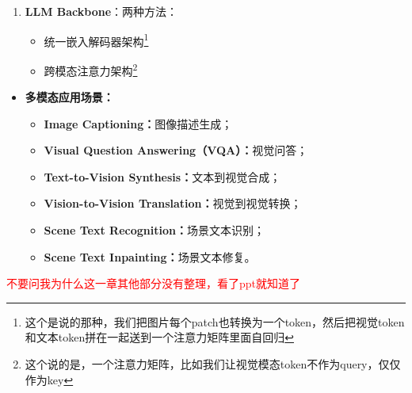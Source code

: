 \documentclass[../main.tex]{subfiles}
\begin{document}
\begin{enumerate}
\begin{enumerate}
\begin{itemize}
            \item 使用线性投影仪或多层感知器(\textbf{MLP})，通常为几层的神经网与非线性激活函数组合而成。
            \item 基于注意力机制。BLIP2引入\textbf{Q-Former}，一种轻量级转换器，使用一组可学习的查询向量从冻结的视觉模型中提取视觉特征。
            \item 投影基于\textbf{CNN}。MobileVLMv2提出了LDPv2，这是一种新的投影。由三部分组成:特征转换、Token压缩和位置信息增强。
            \item 投影基于\textbf{mamba}\footnote{MAN！}。VL-Mamba在其视觉语言投影仪中实现了2D视觉选择性扫描(VSS)技术，促进了不同学习方法的融合。
        \end{itemize}
        \item \textbf{LLM Backbone}：两种方法：
        \begin{itemize}
            \item 统一嵌入解码器架构\footnote{这个是说的那种，我们把图片每个patch也转换为一个token，然后把视觉token和文本token拼在一起送到一个注意力矩阵里面自回归}
            \item 跨模态注意力架构\footnote{这个说的是，一个注意力矩阵，比如我们让视觉模态token不作为query，仅仅作为key}
        \end{itemize}
        
    \end{enumerate}
\end{enumerate}

\begin{itemize}
    \item \textbf{多模态应用场景：}
    \begin{itemize}
        \item \textbf{Image Captioning：}图像描述生成；
        \item \textbf{Visual Question Answering（VQA）：}视觉问答；
        \item \textbf{Text-to-Vision Synthesis：}文本到视觉合成；
        \item \textbf{Vision-to-Vision Translation：}视觉到视觉转换；
        \item \textbf{Scene Text Recognition：}场景文本识别；
        \item \textbf{Scene Text Inpainting：}场景文本修复。
    \end{itemize}
\end{itemize}

\textcolor{red}{不要问我为什么这一章其他部分没有整理，看了ppt就知道了}
\end{document}

